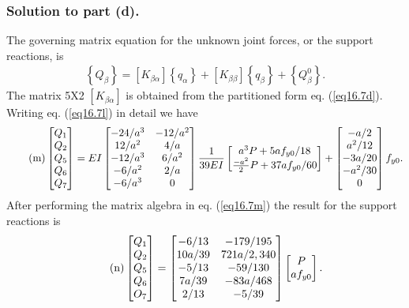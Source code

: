\documentclass{AeroStructure-ERJohnson}
\begin{document}
\begin{example*}
\subsubsection{Solution to part (d).} The governing matrix equation for the unknown joint forces, or the support reactions, is
\begin{align}\label{eq16.7l}\tag{l}
\left\{Q_{\beta}\right\}=\left[K_{\beta \alpha}\right]\left\{q_{\alpha}\right\}+\left[K_{\beta \beta}\right]\left\{q_{\beta}\right\}+\left\{Q_{\beta}^{0}\right\}.
\end{align}
The matrix 5X2 $\left[K_{\beta \alpha}\right]$ is obtained from the partitioned form eq. (\ref{eq16.7d}). Writing eq. (\ref{eq16.7l}) in detail we have
\begin{align}\label{eq16.7m}\tag{m}
\left[\begin{array}{@{}l@{}}Q_{1} \\Q_{2} \\Q_{5} \\Q_{6} \\Q_{7}\end{array}\right]=E I\left[\begin{array}{@{}cc@{}}-24 / a^{3} & -12 / a^{2} \\12 / a^{2} & 4 / a \\-12 / a^{3} & 6 / a^{2} \\-6 / a^{2} & 2 / a \\-6 / a^{3} & 0\end{array}\right] \frac{1}{39 E I}\left[\begin{array}{@{}c@{}}a^{3} P+5 a f_{y 0} / 18 \\\frac{-a^{2}}{2} P+37 a f_{y 0} / 60\end{array}\right]+\left[\begin{array}{@{}c@{}}-a / 2 \\a^{2} / 12 \\-3 a / 20 \\-a^{2} / 30 \\0\end{array}\right] f_{y 0}.
\end{align}
After performing the matrix algebra in eq. (\ref{eq16.7m}) the result for the support reactions is
\begin{align}\label{eq16.7n}\tag{n}
\left[\begin{array}{@{}l@{}}Q_{1} \\Q_{2} \\Q_{5} \\Q_{6} \\O_{7}\end{array}\right]=\left[\begin{array}{@{}cc@{}}-6 / 13 & -179 / 195 \\10 a / 39 & 721 a / 2,340 \\-5 / 13 & -59 / 130 \\7 a / 39 & -83 a / 468 \\2 / 13 & -5 / 39\end{array}\right]\left[\begin{array}{@{}c@{}}P \\a f_{y 0}\end{array}\right].

\end{align}
\end{example*}
\end{document}
